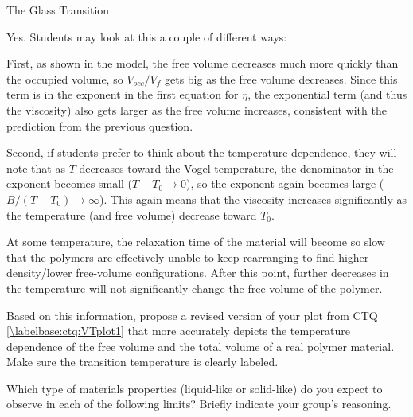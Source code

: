 \begin{activity}{The Glass Transition}
\begin{ctqs}
				\begin{solution}[2in]
					Yes.  Students may look at this a couple of different ways:
					
					First, as shown in the model, the free volume decreases much more quickly than the occupied volume, so $V_{occ}/V_f$ gets big as the free volume decreases.  Since this term is in the exponent in the first equation for $\eta$, the exponential term (and thus the viscosity) also gets larger as the free volume increases, consistent with the prediction from the previous question.
					
					Second, if students prefer to think about the temperature dependence, they will note that as $T$ decreases toward the Vogel temperature, the denominator in the exponent becomes small ($T-T_0\to 0$), so the exponent again becomes large ($B/(T-T_0) \to \infty$).  This again means that the viscosity increases significantly as the temperature (and free volume) decrease toward $T_0$.
				\end{solution}
	
	\clearpage
	\question At some temperature, the relaxation time of the material will become so slow that the polymers are effectively unable to keep rearranging to find higher-density/lower free-volume configurations.  After this point, further decreases in the temperature will not significantly change the free volume of the polymer. \label{\labelbase:ctq:traptemp}
	
		Based on this information, propose a revised version of your plot from CTQ \ref{\labelbase:ctq:VTplot1} that more accurately depicts the temperature dependence of the free volume and the total volume of a real polymer material.  Make sure the transition temperature is clearly labeled.
	
		\vspace{0.25in}
	
		\begin{solution}[1.5in]\end{solution}
		
	\question Which type of materials properties (liquid-like or solid-like) do you expect to observe in each of the following limits?  Briefly indicate your group's reasoning. \label{\labelbase:ctq:properties}
	

\end{ctqs}
\end{activity}
